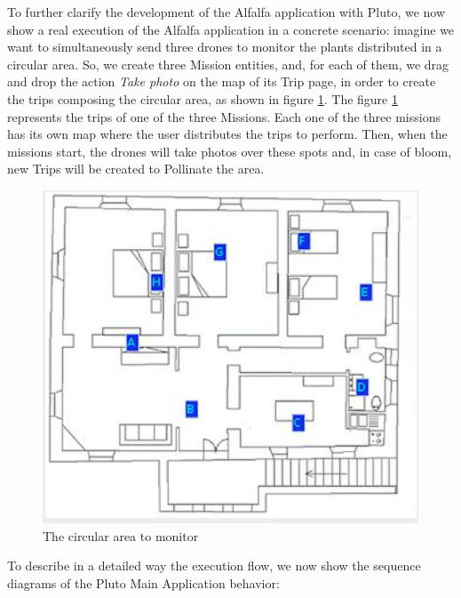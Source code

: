 To further clarify the development of the Alfalfa\cite{alfalfa} application with Pluto, we now show a real execution of the Alfalfa application in a concrete scenario:
imagine we want to simultaneously send three drones to monitor the plants distributed in a circular area.
So, we create three Mission entities, and, for each of them, we drag and drop the action \textit{Take photo} on the map of its Trip page, in order to create the trips composing the circular area, as shown in figure \ref{fig:alfalfaArea}.
The figure \ref{fig:alfalfaArea} represents the trips of one of the three Missions.
Each one of the three missions has its own map where the user distributes the trips to perform.
Then, when the missions start, the drones will take photos over these spots and, in case of bloom, new Trips will be created to Pollinate the area.
\\

\begin{figure}[h!]
  \centering
  \includegraphics[width=\linewidth]{pictures/alfalfaArea.png}
  \caption{The circular area to monitor}
  \label{fig:alfalfaArea}
\end{figure}


To describe in a detailed way the execution flow, we now show the sequence diagrams of the Pluto Main Application behavior:
\\

